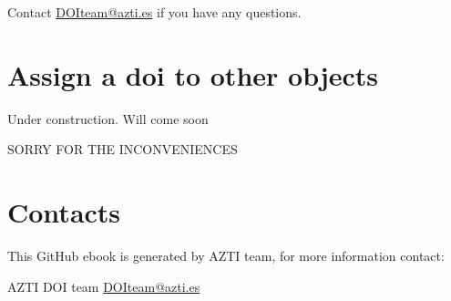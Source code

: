 \documentclass[
]{book}
\begin{document}
Contact \url{DOIteam@azti.es} if you have any questions.

\hypertarget{assign-a-doi-to-other-objects}{%
\chapter{Assign a doi to other objects}\label{assign-a-doi-to-other-objects}}

Under construction. Will come soon

SORRY FOR THE INCONVENIENCES

\hypertarget{contacts}{%
\chapter*{Contacts}\label{contacts}}

This GitHub ebook is generated by AZTI team, for more information contact:

AZTI DOI team \url{DOIteam@azti.es}

  
\end{document}

